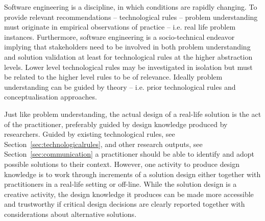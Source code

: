 \documentclass[graybox]{svmult}
\begin{document}
Software engineering is a discipline, in which conditions are rapidly changing. To provide relevant recommendations -- technological rules -- problem understanding must originate in empirical observations of practice -- i.e. real life problem instances. Furthermore, software engineering is a socio-technical endeavor implying that stakeholders need to be involved in both problem understanding and solution validation at least for technological rules at the higher abstraction levels. Lower level technological rules may be investigated in isolation but must be related to the higher level rules to be of relevance. 
Ideally problem understanding can be guided by theory -- i.e. prior technological rules and conceptualisation approaches. 







Just like problem understanding, the actual design of a real-life solution is the act of the practitioner, preferably guided by design knowledge produced by researchers. %
Guided by existing technological rules, see Section~\ref{sec:technologicalrules}, and other research outputs, see Section~\ref{sec:communication} a practitioner should be able to identify and adopt possible solutions to their context. However, one activity to produce design knowledge is to work through increments of a solution design either together with practitioners in a real-life setting or off-line. %
While the solution design is a creative activity, the design knowledge it produces can be made more accessible and trustworthy if critical design decisions are clearly reported together with considerations about alternative solutions.
\end{document}
